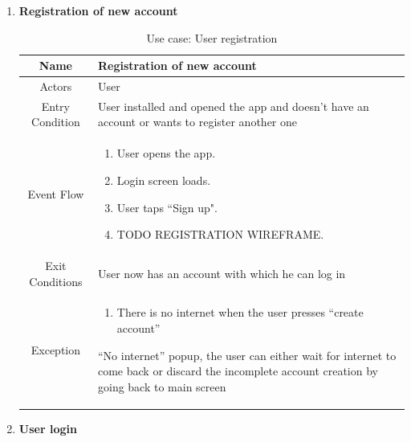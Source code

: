 \begin{enumerate}
	
\item \textbf{Registration of new account}

\begin{table}[H]
{
\begin{tabular}{|c|p{14cm}|}
	\hline
	Name & Registration of new account\\
	\hline
	Actors & User\\
	\hline
	Entry Condition & User installed and opened the app and doesn’t have an account or wants to register another one\\
	\hline
	Event Flow & \begin{enumerate}
		\item User opens the app.
		\item Login screen loads.
		\item User taps “Sign up".
		\item TODO REGISTRATION WIREFRAME.
		\end{enumerate}\\
	\hline
	Exit Conditions & User now has an account with which he can log in\\
	\hline
	Exception & \begin{enumerate}
		\item There is no internet when the user presses “create account”
	\end{enumerate}
	
	“No internet” popup, the user can either wait for internet to come back or discard the incomplete account creation by going back to main screen\\
	\hline
\end{tabular}
}
	\label{tab:UCRegister}
	\caption{Use case: User registration}
\end{table}

\item \textbf{User login}
	

\end{enumerate}
